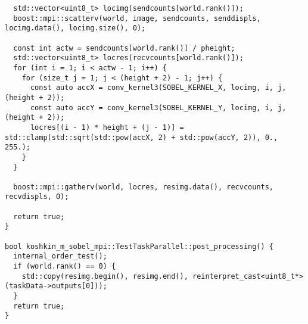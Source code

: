 \documentclass[12pt]{article}
\begin{document}
\begin{lstlisting}
  std::vector<uint8_t> locimg(sendcounts[world.rank()]);
  boost::mpi::scatterv(world, image, sendcounts, senddispls, locimg.data(), locimg.size(), 0);

  const int actw = sendcounts[world.rank()] / pheight;
  std::vector<uint8_t> locres(recvcounts[world.rank()]);
  for (int i = 1; i < actw - 1; i++) {
    for (size_t j = 1; j < (height + 2) - 1; j++) {
      const auto accX = conv_kernel3(SOBEL_KERNEL_X, locimg, i, j, (height + 2));
      const auto accY = conv_kernel3(SOBEL_KERNEL_Y, locimg, i, j, (height + 2));
      locres[(i - 1) * height + (j - 1)] = std::clamp(std::sqrt(std::pow(accX, 2) + std::pow(accY, 2)), 0., 255.);
    }
  }

  boost::mpi::gatherv(world, locres, resimg.data(), recvcounts, recvdispls, 0);

  return true;
}

bool koshkin_m_sobel_mpi::TestTaskParallel::post_processing() {
  internal_order_test();
  if (world.rank() == 0) {
    std::copy(resimg.begin(), resimg.end(), reinterpret_cast<uint8_t*>(taskData->outputs[0]));
  }
  return true;
}
\end{lstlisting}
\end{document}
